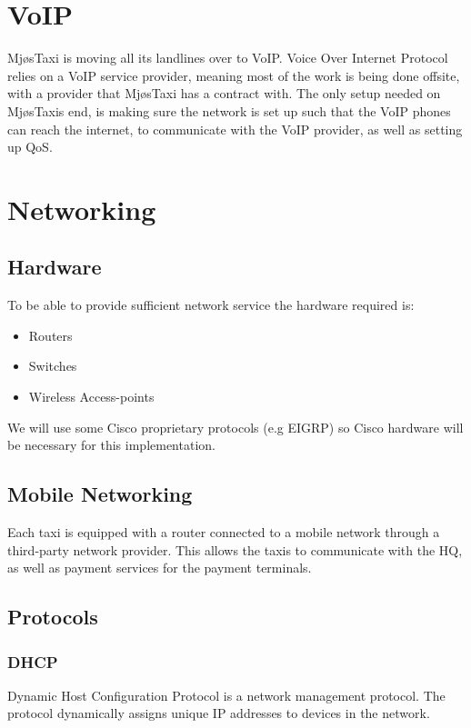 \section{VoIP}
MjøsTaxi is moving all its landlines over to VoIP.
Voice Over Internet Protocol relies on a VoIP service provider, meaning most of the work is being done offsite, with a provider that MjøsTaxi has a contract with. \cite{VoIP} 
The only setup needed on MjøsTaxis end, is making sure the network is set up such that the VoIP phones can reach the internet, to communicate with the VoIP provider, as well as setting up QoS.

\section{Networking}
\subsection{Hardware}
\vspace{-0.6em}
To be able to provide sufficient network service the hardware required is:
    \begin{itemize}[noitemsep]  
        \item Routers
        \item Switches
        \item Wireless Access-points
    \end{itemize}
We will use some Cisco proprietary protocols (e.g EIGRP) so Cisco hardware will be necessary for this implementation.    


\subsection{Mobile Networking}
Each taxi is equipped with a router connected to a mobile network through a third-party network provider.
This allows the taxis to communicate with the HQ, as well as payment services for the payment terminals.

\subsection{Protocols}

\subsubsection{DHCP}
\vspace{-0.6em}
Dynamic Host Configuration Protocol is a network management protocol.
The protocol dynamically assigns unique IP addresses to devices in the network.

